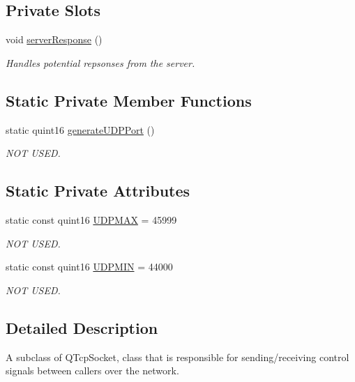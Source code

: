 \subsection*{\-Private \-Slots}
\begin{DoxyCompactItemize}
\item 
void \hyperlink{class_command_client_a4a15f938ab3bc4c6c22ded4784c34176}{server\-Response} ()
\begin{DoxyCompactList}\small\item\em \-Handles potential repsonses from the server. \end{DoxyCompactList}\end{DoxyCompactItemize}
\subsection*{\-Static \-Private \-Member \-Functions}
\begin{DoxyCompactItemize}
\item 
static quint16 \hyperlink{class_command_client_a7255f2d12d3ebd301ecc210be46a524d}{generate\-U\-D\-P\-Port} ()
\begin{DoxyCompactList}\small\item\em \-N\-O\-T \-U\-S\-E\-D. \end{DoxyCompactList}\end{DoxyCompactItemize}
\subsection*{\-Static \-Private \-Attributes}
\begin{DoxyCompactItemize}
\item 
static const quint16 \hyperlink{class_command_client_aad85b9fd20a7256920ec58ebbdc4534b}{\-U\-D\-P\-M\-A\-X} = 45999
\begin{DoxyCompactList}\small\item\em \-N\-O\-T \-U\-S\-E\-D. \end{DoxyCompactList}\item 
static const quint16 \hyperlink{class_command_client_a93ee4eb59cb333a129a142a25ac51390}{\-U\-D\-P\-M\-I\-N} = 44000
\begin{DoxyCompactList}\small\item\em \-N\-O\-T \-U\-S\-E\-D. \end{DoxyCompactList}\end{DoxyCompactItemize}


\subsection{\-Detailed \-Description}
\-A subclass of \-Q\-Tcp\-Socket, class that is responsible for sending/receiving control signals between callers over the network. 

